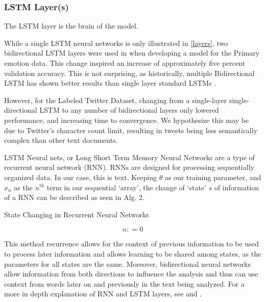 \documentclass[titlepage,letterpaper]{article}
\begin{document}
 \subsubsection{LSTM Layer(s)}

The LSTM layer is the brain of the model.

While a single LSTM neural networks is only illustrated in \cref{layers},  two bidirectional LSTM layers were used in when developing a model for the Primary emotion data. This change inspired an increase of approximately five percent validation accuracy. This is not surprising, as historically, multiple Bidirectional LSTM has shown better results than single layer standard LSTMs \cite{Keras.io,deep_bi}. 

However, for the Labeled Twitter Dataset, changing from a single-layer single-directional LSTM to any number of bidirectional layers  only lowered performance,  and increasing time to convergence.  We hypothesize this may be due to Twitter's character count limit, resulting in tweets being less semantically complex than other text documents.

LSTM Neural nets, or Long Short Term Memory Neural Networks are a type of recurrent neural network (RNN). RNNs are designed for processing sequentially organized data. In our case, this is text. Keeping \(\theta\) as our training parameter, and \(x_n\) as the \( n^\text{th}\) term in our sequential `array', the change of `state' \(s\) of information of a RNN can be described as seen in Alg. 2\cite{NeuralNet}.

\begin{algorithm}[]
		\caption{State Changing in Recurrent Neural Networks}
	\label{alg2}
	\[n \mathrel{{:}{=}} 0\] 
\end{algorithm}

This method recurrence allows for the context of previous information to be used to process later information and allows learning to be shared among states, as the parameters for all states are the same. Moreover, bidirectional neural networks allow information from both directions to influence the analysis and thus can use context from words later on and previously in the text being analyzed.
For a more in depth explanation of RNN and LSTM layers, see \textcite{NeuralNet} and \textcite{graves}.
\end{document}
